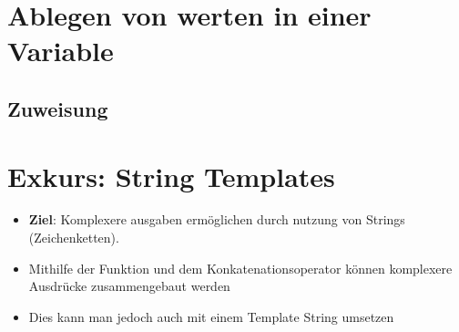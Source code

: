 \section{Ablegen von werten in einer Variable}
\subsection{Zuweisung}
\livecoding




\section{Exkurs: String Templates}
\begin{frame}
    \slidehead

    \begin{itemize}[<+->]
        \item \textbf{Ziel}: Komplexere ausgaben ermöglichen durch nutzung von Strings (Zeichenketten).
        \item Mithilfe der Funktion  und dem Konkatenationsoperator \pythoninline{+} können komplexere Ausdrücke zusammengebaut werden
        \item Dies kann man jedoch auch mit einem Template String umsetzen
    \end{itemize}
\end{frame}

